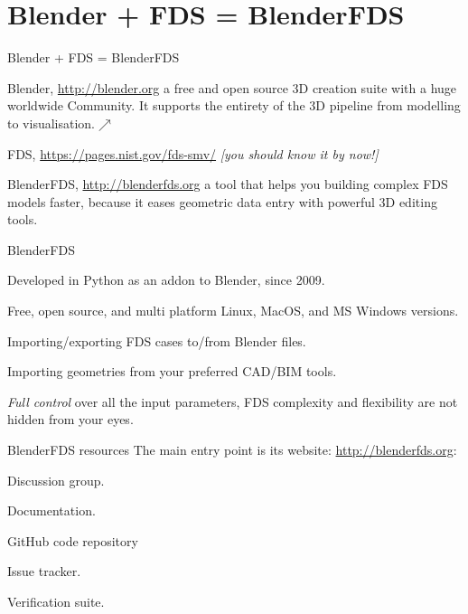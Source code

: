\documentclass[aspectratio=169]{beamer}
\begin{document}
\section{Blender + FDS = BlenderFDS}
\begin{frame}[fragile]{Blender + FDS = BlenderFDS}
    \begin{vfilleditems}
        \item<1-> Blender, \url{http://blender.org}
            {\small \linebreak a free and open source 3D creation suite with a huge worldwide Community.
            \linebreak It supports the entirety of the 3D pipeline from modelling to visualisation.$\nearrow$}
        \item<2-> FDS, \url{https://pages.nist.gov/fds-smv/}
            {\small \linebreak \emph{[you should know it by now!]}}
        \item<3-> BlenderFDS, \url{http://blenderfds.org}
            {\small \linebreak a tool that helps you building complex FDS models faster,
            \linebreak because it eases geometric data entry with powerful 3D editing tools.}
    \end{vfilleditems}  
\end{frame}

\begin{frame}[fragile]{BlenderFDS}
    \begin{vfilleditems}
        \item<1-> Developed in Python as an addon to Blender, since 2009.
        \item<2-> Free, open source, and multi platform
            {\small \linebreak Linux, MacOS, and MS Windows versions.}
        \item<3-> Importing/exporting FDS cases to/from Blender files.
        \item<3-> Importing geometries from your preferred CAD/BIM tools.
        \item<4-> \emph{Full control} over all the input parameters,
            \linebreak FDS complexity and flexibility are not hidden from your eyes.
    \end{vfilleditems}  
\end{frame}

\begin{frame}[fragile]{BlenderFDS resources}
    The main entry point is its website: \url{http://blenderfds.org}:
    \begin{vfilleditems}
        \item Discussion group.
        \item Documentation.
        \item GitHub code repository
        \item Issue tracker.
        \item Verification suite.
    \end{vfilleditems}
\end{frame}
\end{document}

